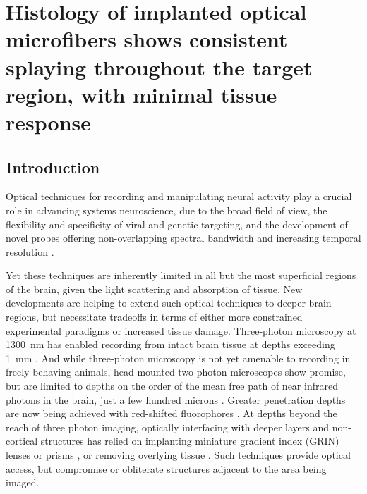 \chapter{Histology of implanted optical microfibers shows consistent splaying throughout the target
region, with minimal tissue response}

\label{chapter:histology}
\thispagestyle{myheadings}

\graphicspath{{3_Histology/Figures/}}

\section{Introduction}

Optical techniques for recording and manipulating neural activity play a 
crucial role in advancing systems neuroscience, due to the broad field of 
view, the flexibility and specificity of viral and genetic targeting, and 
the development of novel probes offering non-overlapping spectral 
bandwidth and increasing temporal resolution 
\cite{Emiliani:2015jl,Gong:2015is}.

Yet these techniques are inherently limited in all but the most 
superficial regions of the brain, given the light scattering and 
absorption of tissue. New developments are helping to extend such optical 
techniques to deeper brain regions, but necessitate tradeoffs in terms of 
either more constrained experimental paradigms or increased tissue damage. 
Three-photon microscopy at 1300~nm has enabled recording from intact brain tissue at 
depths exceeding 1~mm \cite{Horton:2013gxa,Wang:2017jp}. And while 
three-photon microscopy is not yet amenable to recording in freely 
behaving animals, head-mounted two-photon microscopes show promise, but 
are limited to depths on the order of the mean free path of near infrared 
photons in the brain, just a few hundred microns \cite{Zong:2017eg}. 
Greater penetration depths are now being achieved with red-shifted 
fluorophores \cite{Dana:2016hx}. At depths beyond the reach of three 
photon imaging, optically interfacing with deeper layers 
and non-cortical structures has relied on implanting miniature gradient 
index (GRIN) lenses or prisms 
\cite{Jung:2004kv,Barretto:2009hk,Andermann:2013kc,Cui:2013dq}, or removing 
overlying tissue \cite{Dombeck:2010jr}. Such techniques provide 
optical access, but compromise or obliterate structures adjacent to the 
area being imaged.

